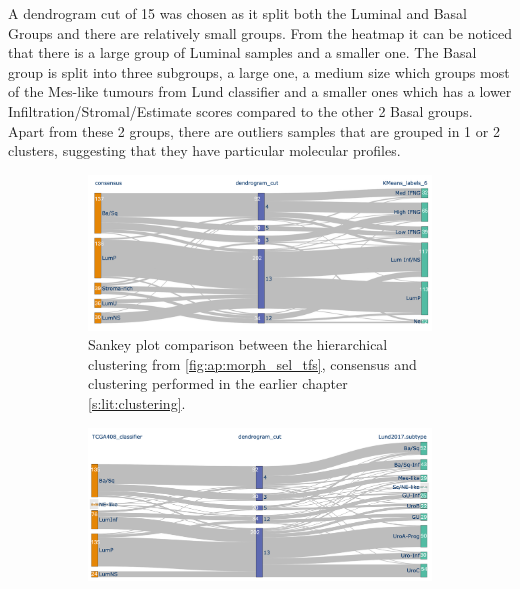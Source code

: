 A dendrogram cut of 15 was chosen as it split both the Luminal and Basal Groups and there are relatively small groups. From the heatmap it can be noticed that there is a large group of Luminal samples and a smaller one. The Basal group is split into three subgroups, a large one, a medium size which groups most of the Mes-like tumours from Lund classifier and a smaller ones which has a lower Infiltration/Stromal/Estimate scores compared to the other 2 Basal groups. Apart from these 2 groups, there are outliers samples that are grouped in 1 or 2 clusters, suggesting that they have particular molecular profiles.

\begin{figure}[!h]
\centering
    \captionsetup[subfigure]{justification=Centering}
\begin{subfigure}[!t]{0.49\textwidth}
    \includegraphics[width=1.0\textwidth,height=1.0\textheight,keepaspectratio]{Sections/Network_I/Resources/selective_pruning/sankey_sel_tfs_VU_CS.png}
    
    \caption{Sankey plot comparison between the hierarchical clustering from \cref{fig:ap:morph_sel_tfs}, consensus \cite{Kamoun2020-tj} and clustering performed in the earlier chapter \cref{s:lit:clustering}.}
    
    \label{fig:N_I:sankey_sel_tfs_vuCs}
\end{subfigure}
\hfil %
\begin{subfigure}[!t]{0.49\textwidth}
    \includegraphics[width=1.0\textwidth,height=1.0\textheight,keepaspectratio]{Sections/Network_I/Resources/selective_pruning/sankey_sel_tfs.png}
    

\end{subfigure}
\end{figure}
